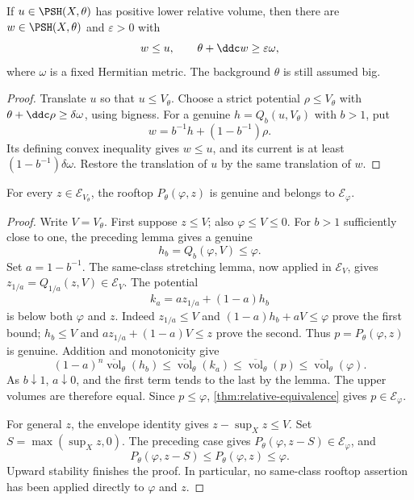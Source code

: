 \begin{corollary}\label{cor:positive-volume-strict-barrier}
If $u\in\PSH(X,\theta)$ has positive lower relative volume, then there are $w\in\PSH(X,\theta)$ and $\varepsilon>0$ with
\[
 w\leq u,\qquad \theta+\ddc w\geq\varepsilon\omega,
\]
where $\omega$ is a fixed Hermitian metric. The background $\theta$ is still assumed big.
\end{corollary}
\begin{proof}
Translate $u$ so that $u\leq V_\theta$. Choose a strict potential $\rho\leq V_\theta$ with $\theta+\ddc\rho\geq\delta\omega$, using bigness. For a genuine $h=Q_b(u,V_\theta)$ with $b>1$, put
\[
 w=b^{-1}h+(1-b^{-1})\rho.
\]
Its defining convex inequality gives $w\leq u$, and its current is at least $(1-b^{-1})\delta\omega$. Restore the translation of $u$ by the same translation of $w$.
\end{proof}

\begin{proposition}\label{prop:big-cross-class-roof}
For every $z\in\mathcal E_{V_\theta}$, the rooftop $P_\theta(\varphi,z)$ is genuine and belongs to $\mathcal E_\varphi$.
\end{proposition}
\begin{proof}
Write $V=V_\theta$. First suppose $z\leq V$; also $\varphi\leq V\leq0$. For $b>1$ sufficiently close to one, the preceding lemma gives a genuine
\[
 h_b=Q_b(\varphi,V)\leq\varphi.
\]
Set $a=1-b^{-1}$. The same-class stretching lemma, now applied in $\mathcal E_V$, gives $z_{1/a}=Q_{1/a}(z,V)\in\mathcal E_V$. The potential
\[
 k_a=a z_{1/a}+(1-a)h_b
\]
is below both $\varphi$ and $z$. Indeed $z_{1/a}\leq V$ and $(1-a)h_b+aV\leq\varphi$ prove the first bound; $h_b\leq V$ and $a z_{1/a}+(1-a)V\leq z$ prove the second. Thus $p=P_\theta(\varphi,z)$ is genuine. Addition and monotonicity give
\[
 (1-a)^n\overline{\operatorname{vol}}_\theta(h_b)
 \leq\overline{\operatorname{vol}}_\theta(k_a)
 \leq\overline{\operatorname{vol}}_\theta(p)
 \leq\overline{\operatorname{vol}}_\theta(\varphi).
\]
As $b\downarrow1$, $a\downarrow0$, and the first term tends to the last by the lemma. The upper volumes are therefore equal. Since $p\leq\varphi$, \cref{thm:relative-equivalence} gives $p\in\mathcal E_\varphi$.

For general $z$, the envelope identity gives $z-\sup_Xz\leq V$. Set $S=\max(\sup_Xz,0)$. The preceding case gives $P_\theta(\varphi,z-S)\in\mathcal E_\varphi$, and
\[
 P_\theta(\varphi,z-S)\leq P_\theta(\varphi,z)\leq\varphi.
\]
Upward stability finishes the proof. In particular, no same-class rooftop assertion has been applied directly to $\varphi$ and $z$.
\end{proof}

